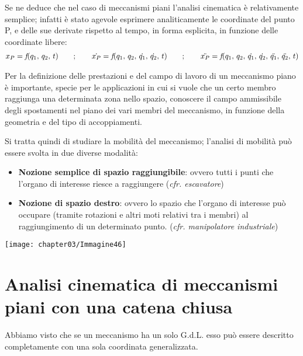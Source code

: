 			Se ne deduce che nel caso di meccanismi piani l'analisi cinematica è relativamente semplice; infatti è stato agevole esprimere analiticamente le coordinate del punto P, e delle sue derivate rispetto al tempo, in forma esplicita, in funzione delle coordinate libere:
			\begin{gather*}
				x_P = \emph{f}(q_1,\,q_2,\,t)\qquad;\qquad \dot{x_P} = \emph{f}(q_1,\,q_2,\,\dot{q_1},\,\dot{q_2},\,t)\qquad;\qquad \ddot{x_P} = \emph{f}(q_1,\,q_2,\,\dot{q_1},\,\dot{q_2},\,\ddot{q_1},\,\ddot{q_2},\,t)
			\end{gather*}
			
			Per la definizione delle prestazioni e del campo di lavoro di un meccanismo piano è importante, specie per le applicazioni in cui si vuole che un certo membro raggiunga una determinata zona nello spazio, conoscere il campo ammissibile degli spostamenti nel piano dei vari membri del meccanismo, in funzione della geometria e del tipo di accoppiamenti.
			
		Si tratta quindi di studiare la mobilità del meccanismo; l'analisi di mobilità può essere svolta in due diverse modalità:
		\vspace{1mm}
		
			\begin{minipage}{.5\textwidth}	
			\begin{itemize}
				\item \textbf{Nozione semplice di spazio raggiungibile}: ovvero tutti i punti che l'organo di interesse riesce a raggiungere (\emph{cfr. escavatore})
				\item \textbf{Nozione di spazio destro}: ovvero lo spazio che l'organo di interesse può occupare (tramite rotazioni e altri moti relativi tra i membri) al raggiungimento di un determinato punto. (\emph{cfr. manipolatore industriale})
			\end{itemize}
			\end{minipage}
			\hfill
			\begin{minipage}{.5\textwidth}
			\centering
			\texttt{[image: chapter03/Immagine46]}
			\end{minipage}
			
			\section{Analisi cinematica di meccanismi piani con una catena chiusa}
			
			Abbiamo visto che se un meccanismo ha un solo G.d.L. esso può essere descritto completamente con una sola coordinata generalizzata.
			
